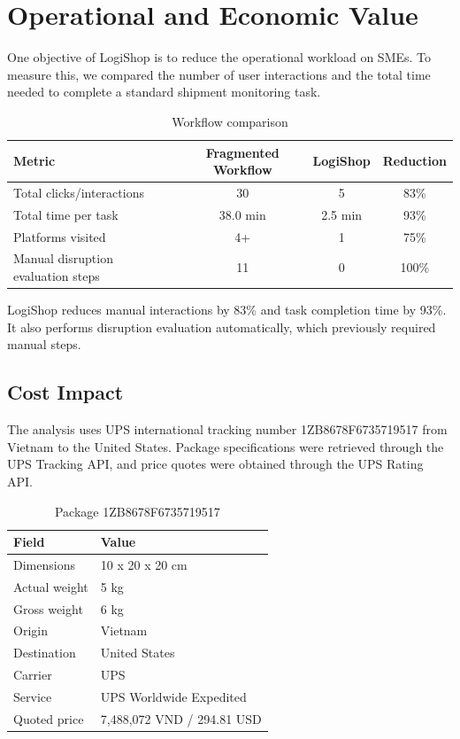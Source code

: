 \section{Operational and Economic Value}

One objective of LogiShop is to reduce the operational workload on SMEs. To measure this, we compared the number of user interactions and the total time needed to complete a standard shipment monitoring task.

\begin{table}[H]
\centering
\caption{Workflow comparison}
\begin{tabular}{lccc}
\toprule
\textbf{Metric} & \textbf{Fragmented Workflow} & \textbf{LogiShop} & \textbf{Reduction}\\
\midrule
Total clicks/interactions & 30 & 5 & 83\%\\
Total time per task & 38.0 min & 2.5 min & 93\%\\
Platforms visited & 4+ & 1 & 75\%\\
Manual disruption evaluation steps & 11 & 0 & 100\%\\
\bottomrule
\end{tabular}
\end{table}

LogiShop reduces manual interactions by 83\% and task completion time by 93\%. It also performs disruption evaluation automatically, which previously required manual steps.

\subsection{Cost Impact}

The analysis uses UPS international tracking number 1ZB8678F6735719517 from Vietnam to the United States. Package specifications were retrieved through the UPS Tracking API, and price quotes were obtained through the UPS Rating API.

\begin{table}[H]
\centering
\caption{Package 1ZB8678F6735719517}
\begin{tabular}{ll}
\toprule
\textbf{Field} & \textbf{Value}\\
\midrule
Dimensions & 10 x 20 x 20 cm\\
Actual weight & 5 kg\\
Gross weight & 6 kg\\
Origin & Vietnam\\
Destination & United States\\
Carrier & UPS\\
Service & UPS Worldwide Expedited\\
Quoted price & 7,488,072 VND / 294.81 USD\\
\bottomrule
\end{tabular}
\end{table}

